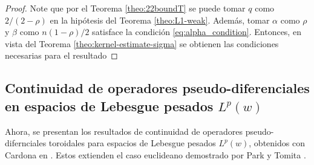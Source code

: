 \begin{proof}
	Note que por el Teorema \ref{theo:22boundT} se puede tomar $q$ como $2/(2-\rho)$ en la hipótesis del Teorema \ref{theo:L1-weak}. Además, tomar $\alpha$ como $\rho$ y $\beta$ como $n(1-\rho)/2$ satisface la condición  \cref{eq:alpha_condition}. Entonces, en vista del Teorema \ref{theo:kernel-estimate-sigma} se obtienen las condiciones necesarias para el resultado
\end{proof}
\subsection{Continuidad de operadores pseudo-diferenciales en espacios de Lebesgue pesados $L^p(w)$}
Ahora, se presentan los resultados de continuidad de operadores pseudo-difernciales toroidales para espacios de Lebesgue pesados $L^p(w)$, obtenidos con Cardona en \cite{cardona-martinez-III}. Estos extienden el caso euclideano demostrado por Park y Tomita \cite{park-tomita}.

